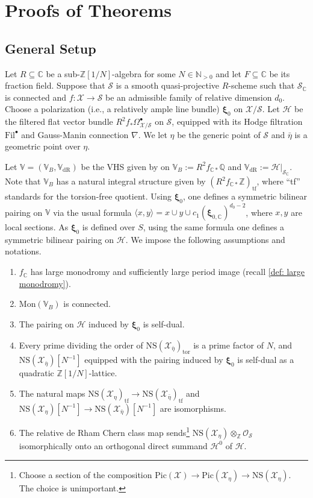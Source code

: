 \documentclass[letter, 11pt]{article}
\theoremstyle{plain}
\theoremstyle{definition}
\newcommand{\IC}{\mathbb{C}}
\newcommand{\IN}{\mathbb{N}}
\newcommand{\IQ}{\mathbb{Q}}
\newcommand{\IV}{\mathbb{V}}
\newcommand{\IZ}{\mathbb{Z}}
\newcommand\tensor{{\otimes}}
\newcommand{\<}{\langle}
\renewcommand{\>}{\rangle}
\def\wt{\widetilde}
\newcommand{\tf}{\wt{f}}
\newcommand{\sH}{\mathcal{H}}
\newcommand{\sX}{\mathcal{X}}
\newcommand{\sS}{\mathcal{S}}
\newcommand{\sO}{\mathcal{O}}
\newcommand{\Pic}{\mathrm{Pic}}
\newcommand{\Fil}{\mathrm{Fil}}
\newcommand{\dR}{\mathrm{dR}}
\newcommand{\NS}{\mathrm{NS}}
\newcommand{\bxi}{\boldsymbol{\xi}}
\renewcommand{\tf}{\mathrm{tf}}
\newcommand{\Mon}{\mathrm{Mon}}
\begin{document}
\section{Proofs of Theorems}
\subsection{General Setup} \label{sec: general setup}
Let $R \subseteq \IC$ be a sub-$\IZ[1/N]$-algebra for some $N \in \IN_{>0}$ and let $F \subseteq \IC$ be its fraction field. Suppose that $\sS$ is a smooth quasi-projective $R$-scheme such that $\sS_\IC$ is connected and $f : \sX \to \sS$ be an admissible family of relative dimension $d_0$. Choose a polarization (i.e., a relatively ample line bundle) $\bxi_0$ on $\sX/\sS$. Let $\sH$ be the filtered flat vector bundle $R^2 f_* \Omega^\bullet_{\sX/\sS}$ on $\sS$, equipped with its Hodge filtration $\Fil^\bullet$ and Gauss-Manin connection $\nabla$. We let $\eta$ be the generic point of $\sS$ and $\bar{\eta}$ is a geometric point over $\eta$.

Let $\IV = (\IV_B, \IV_\dR)$ be the VHS given by on $\IV_B := R^2 f_{\IC *} \IQ$ and $\IV_\dR := \sH|_{\sS_\IC}$. Note that $\IV_B$ has a natural integral structure given by $(R^2 f_{\IC*} \IZ)_{\mathrm{tf}}$, where ``tf'' standards for the torsion-free quotient. Using $\bxi_0$, one defines a symmetric bilinear pairing on $\IV$ via the usual formula $\< x, y \> = x \cup y \cup c_1(\bxi_{0, \IC})^{d_0 - 2}$, where $x, y$ are local sections. As $\bxi_0$ is defined over $S$, using the same formula one defines a symmetric bilinear pairing on $\sH$. We impose the following assumptions and notations. 
\begin{enumerate}[label=\upshape{(\roman*)}]
    \item $f_\IC$ has large monodromy and sufficiently large period image (recall \ref{def: large monodromy}). 
    \item $\Mon(\IV_B)$ is connected. 
    \item The pairing on $\sH$ induced by $\bxi_0$ is self-dual. 
    \item Every prime dividing the order of $\NS(\sX_{\bar{\eta}})_{\mathrm{tor}}$ is a prime factor of $N$, and $\NS(\sX_{\bar{\eta}})[N^{-1}]$ equipped with the pairing induced by $\bxi_0$ is self-dual as a quadratic $\IZ[1/N]$-lattice. 
    \item The natural maps $\NS(\sX_\eta)_\tf \to \NS(\sX_{\bar{\eta}})_\tf$ and $\NS(\sX_\eta)[N^{-1}] \to \NS(\sX_{\bar{\eta}})[N^{-1}]$ are isomorphisms. 
    \item The relative de Rham Chern class map sends\footnote{Choose a section of the composition $\Pic(\sX) \to \Pic(\sX_\eta) \to \NS(\sX_\eta)$. The choice is unimportant.} $\NS(\sX_\eta) \tensor_\IZ \sO_\sS$ isomorphically onto an orthogonal direct summand $\sH^0$ of $\sH$.
\end{enumerate}
\end{document}
